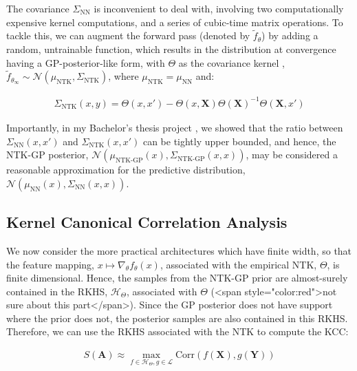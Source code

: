 \documentclass[a4paper,12pt]{article}
\begin{document}
The covariance $\Sigma_{\text{NN}}$ is inconvenient to deal with, involving two computationally expensive kernel computations, and a series of cubic-time matrix operations. To tackle this, we can augment the forward pass (denoted by $\tilde{f}_{\theta}$) by adding a random, untrainable function, which results in the distribution at convergence having a GP-posterior-like form, with $\Theta$ as the covariance kernel \cite{bobby_2020_bayesian-ensembles-ntk}, $\tilde{f}_{\theta_{\infty}} \sim \mathcal{N}\left(\mu_{\text{NTK}},\Sigma_{\text{NTK}}\right)$, where $\mu_{\text{NTK}} = \mu_{\text{NN}}$ and:

\begin{align}
    \Sigma_{\text{NTK}}\left(x,y\right) = \Theta\left(x,x'\right) - \Theta\left(x,\mathbf{X}\right) \Theta\left(\mathbf{X}\right)^{-1} \Theta\left(\mathbf{X},x'\right)
\end{align}

Importantly, in my Bachelor's thesis project \cite{hemachandra23a}, we showed that the ratio between $\Sigma_{\text{NN}}\left(x,x'\right)$ and $\Sigma_{\text{NTK}}\left(x,x'\right)$ can be tightly upper bounded, and hence, the NTK-GP posterior, $\mathcal{N}\left(\mu_{\text{NTK-GP}}\left(x\right),\Sigma_{\text{NTK-GP}}\left(x,x\right)\right)$, may be considered a reasonable approximation for the predictive distribution, $\mathcal{N}\left(\mu_{\text{NN}}\left(x\right),\Sigma_{\text{NN}}\left(x,x\right)\right)$.

\subsection{Kernel Canonical Correlation Analysis}

We now consider the more practical architectures which have finite width, so that the feature mapping, $x \mapsto \nabla_{\theta}f_{\theta}\left(x\right)$, associated with the empirical NTK, $\Theta$, is finite dimensional. Hence, the samples from the NTK-GP prior are almost-surely contained in the RKHS, $\mathcal{H}_{\Theta}$, associated with $\Theta$ (<span style="color:red">not sure about this part</span>). Since the GP posterior does not have support where the prior does not, the posterior samples are also contained in this RKHS. Therefore, we can use the RKHS associated with the NTK to compute the KCC:

\begin{align}
    S\left(\mathbf{A}\right)
    \approx \max_{f\in\mathcal{H}_{\Theta}, g\in\mathcal{L}} \text{Corr}\left(f\left(\mathbf{X}\right), g\left(\mathbf{Y}\right)\right)
\end{align}
\end{document}
